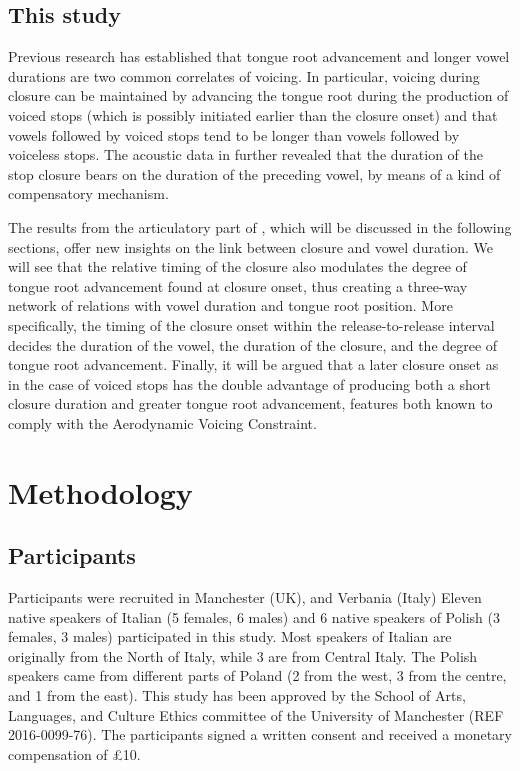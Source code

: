 \documentclass[
  12pt,
]{article}
\begin{document}
\hypertarget{this-study}{%
\subsection{This study}\label{this-study}}

Previous research has established that tongue root advancement and
longer vowel durations are two common correlates of voicing. In
particular, voicing during closure can be maintained by advancing the
tongue root during the production of voiced stops (which is possibly
initiated earlier than the closure onset) and that vowels followed by
voiced stops tend to be longer than vowels followed by voiceless stops.
The acoustic data in \citet{coretta2018j} further revealed that the
duration of the stop closure bears on the duration of the preceding
vowel, by means of a kind of compensatory mechanism.

The results from the articulatory part of \citet{coretta2018j}, which
will be discussed in the following sections, offer new insights on the
link between closure and vowel duration. We will see that the relative
timing of the closure also modulates the degree of tongue root
advancement found at closure onset, thus creating a three-way network of
relations with vowel duration and tongue root position. More
specifically, the timing of the closure onset within the
release-to-release interval decides the duration of the vowel, the
duration of the closure, and the degree of tongue root advancement.
Finally, it will be argued that a later closure onset as in the case of
voiced stops has the double advantage of producing both a short closure
duration and greater tongue root advancement, features both known to
comply with the Aerodynamic Voicing Constraint.

\hypertarget{methodology}{%
\section{Methodology}\label{methodology}}

\hypertarget{participants}{%
\subsection{Participants}\label{participants}}

Participants were recruited in Manchester (UK), and Verbania (Italy)
Eleven native speakers of Italian (5 females, 6 males) and 6 native
speakers of Polish (3 females, 3 males) participated in this study. Most
speakers of Italian are originally from the North of Italy, while 3 are
from Central Italy. The Polish speakers came from different parts of
Poland (2 from the west, 3 from the centre, and 1 from the east). This
study has been approved by the School of Arts, Languages, and Culture
Ethics committee of the University of Manchester (REF 2016-0099-76). The
participants signed a written consent and received a monetary
compensation of £10.
\end{document}
